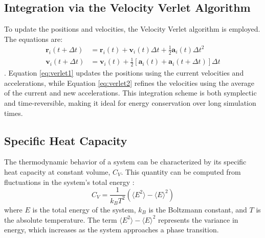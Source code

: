 \documentclass{article}
\begin{document}
\subsection{Integration via the Velocity Verlet Algorithm}
To update the positions and velocities, the Velocity Verlet algorithm is employed. The equations are:
\begin{align}
    \mathbf{r}_i(t+\Delta t) &= \mathbf{r}_i(t) + \mathbf{v}_i(t)\Delta t + \frac{1}{2} \mathbf{a}_i(t)\Delta t^2 \label{eq:verlet1} \\
    \mathbf{v}_i(t+\Delta t) &= \mathbf{v}_i(t) + \frac{1}{2}\left[\mathbf{a}_i(t) + \mathbf{a}_i(t+\Delta t)\right]\Delta t \label{eq:verlet2}
\end{align}\cite{allen1989computer}.
Equation \eqref{eq:verlet1} updates the positions using the current velocities 
and accelerations, while Equation \eqref{eq:verlet2} refines the velocities using
the average of the current and new accelerations. This integration scheme is 
both symplectic and time-reversible, making it ideal for energy conservation over
long simulation times.

\subsection{Specific Heat Capacity}
The thermodynamic behavior of a system can be characterized by its specific heat capacity at constant volume, \(C_V\). This quantity 
can be computed from fluctuations in the system’s total energy \cite{mcquarrie2000statistical}:
\begin{equation}\label{eqhc}
    C_V = \frac{1}{k_B T^2} \left( \langle E^2 \rangle - \langle E \rangle^2 \right)
\end{equation}
where \(E\) is the total energy of the system, \(k_B\) is the Boltzmann constant, and \(T\) is the absolute temperature. 
The term \(\langle E^2 \rangle - \langle E \rangle^2\) represents the variance in energy, which increases as the system approaches a 
phase transition.
\end{document}
